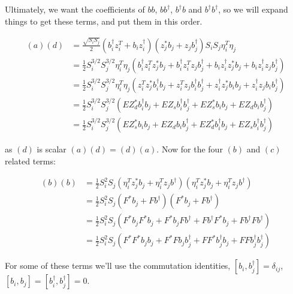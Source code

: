 \documentclass{article}
\begin{document}
Ultimately, we want the coefficients of $bb$, $bb^\dagger$, $b^\dagger b$ and $b^\dagger b^\dagger$,
so we will expand things to get these terms, and put them in this order.

\begin{align} (a)(d) &= \frac{\sqrt{S_i S_j}}{2} \left(b_i^\dagger z_i^T + b_i z_i^\dagger \right) \left(z_j^* b_j + z_j b_j^\dagger\right) S_i S_j\eta_i^T \eta_j \\
&= \frac{1}{2} S_i^{3/2} S_j^{3/2} \eta_i^T \eta_j \left(
b_i^\dagger z_i^T z_j^* b_j +
b_i^\dagger z_i^T z_j b_j^\dagger +
b_i z_i^\dagger z_j^* b_j +
b_i z_i^\dagger z_j b_j^\dagger
\right) \\
&= \frac{1}{2} S_i^{3/2} S_j^{3/2} \eta_i^T \eta_j \left(
z_i^T z_j^* b_i^\dagger b_j +
z_i^T z_j b_i^\dagger b_j^\dagger +
z_i^\dagger z_j^* b_i b_j +
z_i^\dagger z_j b_i b_j^\dagger
\right) \\
&= \frac{1}{2} S_i^{3/2} S_j^{3/2} \left(
E Z_d^* b_i^\dagger b_j +
E Z_s b_i^\dagger b_j^\dagger +
E Z_s^* b_i b_j +
E Z_d b_i b_j^\dagger
\right)\\
&= \frac{1}{2} S_i^{3/2} S_j^{3/2} \left(
E Z_s^* b_i b_j +
E Z_d b_i b_j^\dagger +
E Z_d^* b_i^\dagger b_j +
E Z_s b_i^\dagger b_j^\dagger
\right)
\end{align}

as $(d)$ is scalar $(a)(d) = (d)(a)$. Now for the four $(b)$ and $(c)$ related terms:

\begin{align}
(b)(b) &= \frac{1}{2} S_i^2 S_j \left(\eta_i^T z_j^* b_j + \eta_i^T z_j b^\dagger \right) \left(\eta_i^T z_j^* b_j + \eta_i^T z_j b^\dagger \right) \\
&= \frac{1}{2} S_i^2 S_j \left(F^* b_j + F b^\dagger \right) \left(F^* b_j + F b^\dagger \right) \\
&= \frac{1}{2} S_i^2 S_j \left(
F^* b_j F^* b_j +
F^* b_j F b^\dagger +
F b^\dagger F^* b_j +
F b^\dagger F b^\dagger
\right) \\
&= \frac{1}{2} S_i^2 S_j \left(
F^* F^* b_j b_j +
F^* F b_j b_j^\dagger +
F F^* b_j^\dagger b_j +
F F b_j^\dagger b_j^\dagger
\right)
\end{align}

For some of these terms we'll use the commutation identities, $[b_i, b^\dagger_j] = \delta_{ij}$, $[b_i, b_j] = [b_i^\dagger, b_j^\dagger] = 0$.
\end{document}

